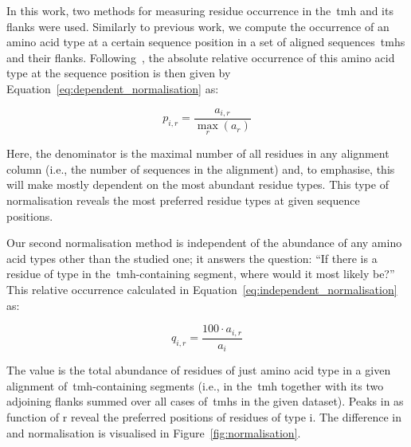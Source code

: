In this work, two methods for measuring residue occurrence in the~\gls{tmh} and its flanks were used.
Similarly to previous work, we compute the occurrence  of an amino acid type  at a certain sequence position  in a set of aligned sequences~\gls{tmh}s and their flanks.
Following~\cite{Sharpe2010}, the absolute relative occurrence  of this amino acid type at the sequence position  is then given by Equation~\ref{eq:dependent_normalisation} as:

\begin{equation} \label{eq:dependent_normalisation}
  p_{i,r}=\frac{a_{i,r}}{\underset{r}{\max}{(a_r)}}
\end{equation}


Here, the denominator is the maximal number of all residues in any alignment column (i.e., the number of sequences in the alignment) and, to emphasise, this will make  mostly dependent on the most abundant residue types.
This type of normalisation reveals the most preferred residue types at given sequence positions.

Our second normalisation method is independent of the abundance of any amino acid types other than the studied one; it answers the question: ``If there is a residue of type  in the~\gls{tmh}-containing segment, where would it most likely be?'' This relative occurrence  calculated in Equation~\ref{eq:independent_normalisation} as:

 \begin{equation} \label{eq:independent_normalisation}
   q_{i,r}=\frac{{100}\cdot{a_{i,r}}}{a_i}
 \end{equation}

The value  is the total abundance of residues of just amino acid type  in a given alignment of~\gls{tmh}-containing segments (i.e., in the~\gls{tmh} together with its two adjoining flanks summed over all cases of~\gls{tmh}s in the given dataset).
Peaks in as function of r reveal the preferred positions of residues of type i.
The difference in   and   normalisation is visualised in Figure~\ref{fig:normalisation}.

